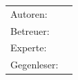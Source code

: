 \begin{titlepage}
\begin{center}
	\vspace{5ex}
	\begin{framed}
		\timeperiod
	\end{framed}
\end{center}

\vspace{11ex}
\begin{tabular}{ll} %
	Autoren:        & \authors    \\
	Betreuer:        & \advisor    \\
	Experte:         & \experte    \\
	Gegenleser:      & \gegenleser \\
\end{tabular}

\end{titlepage}

\restoregeometry %
